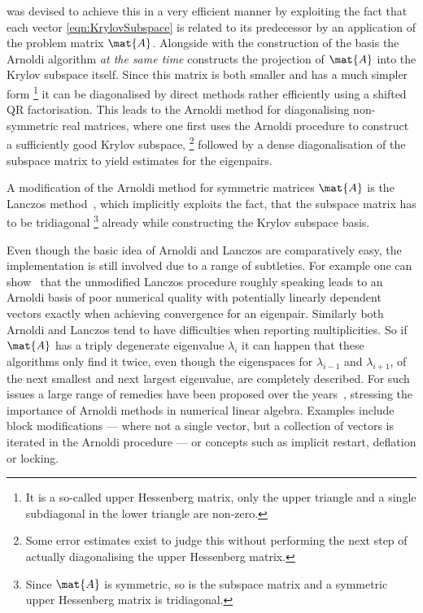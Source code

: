 was devised to achieve this in a very efficient manner
by exploiting the fact that each vector \eqref{eqn:KrylovSubspace}
is related to its predecessor by an application of the problem matrix $\mat{A}$.
Alongside with the construction of the basis the Arnoldi algorithm
\emph{at the same time} constructs the projection of $\mat{A}$
into the Krylov subspace itself.
Since this matrix is both smaller and has a much simpler form%
\footnote{It is a so-called upper Hessenberg matrix,
	\ie only the upper triangle and a single subdiagonal in the lower
	triangle are non-zero.}
it can be diagonalised by direct methods rather efficiently
using a shifted QR factorisation.
This leads to the Arnoldi method for diagonalising
non-symmetric real matrices,
where one first uses the Arnoldi procedure to construct a sufficiently
good Krylov subspace,%
\footnote{Some error estimates exist to judge this without performing
the next step of actually diagonalising the upper Hessenberg matrix.}
followed by a dense diagonalisation of the subspace matrix
to yield estimates for the eigenpairs.

A modification of the Arnoldi method for symmetric matrices $\mat{A}$
is the Lanczos method~,
which implicitly exploits the fact,
that the subspace matrix has to be tridiagonal%
\footnote{Since $\mat{A}$ is symmetric, so is the subspace matrix
and a symmetric upper Hessenberg matrix is tridiagonal.}
already while constructing the Krylov subspace basis.

Even though the basic idea of Arnoldi and Lanczos are comparatively easy,
the implementation is still involved
due to a range of subtleties.
For example one can show~\cite{Arbenz2010} that the unmodified
Lanczos procedure roughly speaking
leads to an Arnoldi basis of poor numerical quality
with potentially linearly dependent vectors
exactly when achieving convergence for an eigenpair.
Similarly both Arnoldi and Lanczos tend to have difficulties
when reporting multiplicities.
So if $\mat{A}$ has a triply degenerate eigenvalue $\lambda_i$
it can happen that these algorithms only find it twice,
even though the eigenspaces for $\lambda_{i-1}$
and $\lambda_{i+1}$,
\ie of the next smallest and next largest eigenvalue,
are completely described.
For such issues a large range of remedies have been proposed
over the years~\cite{Arbenz2010,Saad2003},
stressing the importance of Arnoldi methods in numerical linear algebra.
Examples include block modifications ---
where not a single vector, but a collection of vectors is iterated
in the Arnoldi procedure ---
or concepts such as implicit restart, deflation or locking.

